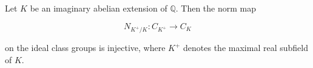 Let $K$ be an imaginary abelian extension of $\mathbb{Q}$. Then the norm map

$$N_{K^+/K}: C_{K^+} \to C_K$$

on the ideal class groups is injective, where $K^+$ denotes the maximal real subfield of $K$.
